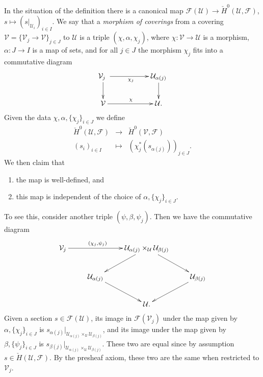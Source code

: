 \noindent
In the situation of the definition there is a canonical map
$\mathcal{F}(\mathcal{U}) \to \check H^0 (\mathcal{U}, \mathcal{F})$,
$s \mapsto (s |_{\mathcal{U}_i})_{i\in I}$.
We say that a {\it morphism of coverings} from a covering
$\mathcal{V} = \{ \mathcal{V}_j \to \mathcal{V}\}_{j \in  J}$
to $\mathcal{U}$ is a triple $(\chi, \alpha, \chi_j)$, where
$\chi : \mathcal{V} \to \mathcal{U}$ is a morphism,
$\alpha : J \to I$ is a map of sets, and for all 
$j \in J$ the morphism $\chi_j$ fits into a commutative diagram
$$
\xymatrix{
{\mathcal{V}_j\ } \ar[rr]_{\chi_j} \ar[d] & &
{\mathcal{U}_{\alpha(j)}} \ar[d]
\\
\mathcal{V} \ar[rr]^\chi & &
{\mathcal{U}.}
}
$$
Given the data $\chi, \alpha, \{\chi_j\}_{i\in J}$ we define
\begin{eqnarray*}
\check H^0 (\mathcal{U}, \mathcal{F}) & \to &
\check H^0 (\mathcal{V}, \mathcal{F}) \\
(s_i)_{i\in I} & \mapsto & \left(\chi_j^*\left(s 
_{\alpha(j)}\right)\right)_{j\in J}.
\end{eqnarray*}
We then claim that 
\begin{enumerate}
\item the map is well-defined, and
\item this map is independent of the choice of $\alpha, \{\chi_j\}_{i\in J}$.
\end{enumerate}
To see this, consider another triple $(\psi, \beta, \psi_j)$.
Then we have the commutative diagram
$$
\xymatrix{
{\mathcal{V}_j}  \ar^{(\chi_j, \psi_j)\qquad}[rr] & & 
{\mathcal{U}_{\alpha(j)}\times_\mathcal{U} \mathcal{U}_{\beta(j)}} \ar[dl] 
\ar[dr] \\
& {\mathcal{U}_{\alpha(j)}} \ar[dr] && {\mathcal{U}_{\beta(j)}} \ar[dl] \\
& &{\mathcal{U}.}
}
$$
Given a section $s \in \mathcal{F}(\mathcal{U})$, its image in 
$\mathcal{F}(\mathcal{V}_j)$ under the map given by $\alpha, \{\chi_j\}_{i\in 
J}$ is $s_{\alpha(j)} | _{{\mathcal{U}_{\alpha(j)}\times_\mathcal{U} 
\mathcal{U}_{\beta(j)}}}$, and its image under the map given by $\beta, 
\{\psi_j\}_{i\in J}$ is $s_{\beta(j)} | 
_{{\mathcal{U}_{\alpha(j)}\times_\mathcal{U} \mathcal{U}_{\beta(j)}}}$. These 
two are equal since by assumption $s \in \check H(\mathcal{U}, \mathcal{F})$. 
By the presheaf axiom, these two are the same when restricted to 
$\mathcal{V}_j$.

